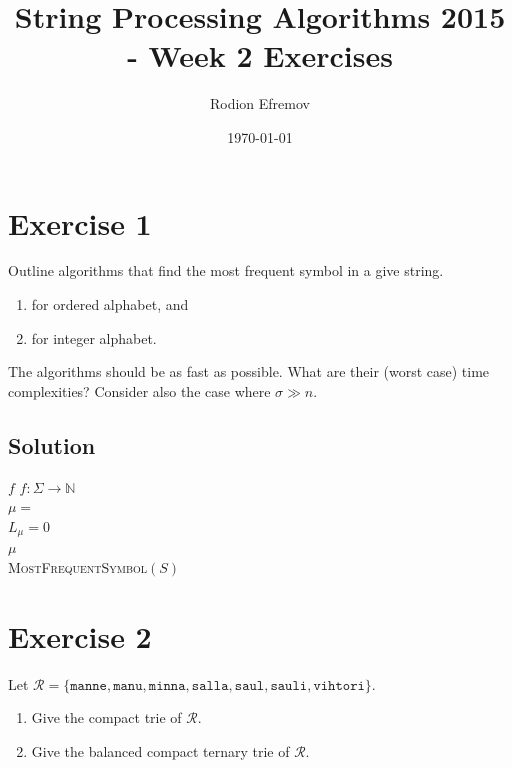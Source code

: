 \documentclass[10pt]{article}
\title{String Processing Algorithms 2015 - Week 2 Exercises}
\author{Rodion Efremov}
\date{\today}
\begin{document}
\maketitle

\section*{Exercise 1}
\color{blue} Outline algorithms that find the most frequent symbol in a give string.
\begin{enumerate}[label=(\alph*)]
\item for ordered alphabet, and
\item for integer alphabet.
\end{enumerate}
The algorithms should be as fast as possible. What are their (worst case) time complexities?  Consider also the case where $\sigma \gg n$. \color{black}

\subsection*{Solution}
\begin{algorithm}
\KwLet $f$ \KwEmptyMap $f \colon \Sigma \to \mathbb{N}$ \\
$\mu = $ \KwNil \\
$L_{\mu} = 0$ \\
\KwRet $\mu$ \\ 
\caption{\textsc{MostFrequentSymbol}$(S)$}
\end{algorithm}

\section*{Exercise 2}
\color{blue} Let $\mathcal{R} = \{ \texttt{manne}, \texttt{manu}, \texttt{minna}, \texttt{salla},\texttt{saul}, \texttt{sauli}, \texttt{vihtori} \}$.
\begin{enumerate}[label=(\alph*)]
\item Give the compact trie of $\mathcal{R}$.
\item Give the balanced compact ternary trie of $\mathcal{R}$.
\end{enumerate}
\color{black}
\end{document}
